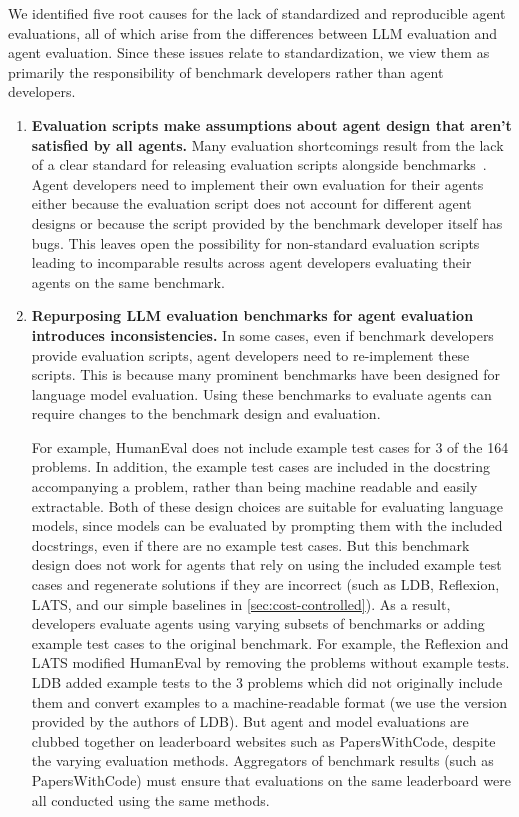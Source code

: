 \documentclass{article}
\begin{document}
We identified five root causes for the lack of standardized and reproducible agent evaluations, all of which arise from the differences between LLM evaluation and agent evaluation. Since these issues relate to standardization, we view them as primarily the responsibility of benchmark developers rather than agent developers.

\begin{enumerate}[leftmargin=*]

    \item \textbf{Evaluation scripts make assumptions about agent design that aren't satisfied by all agents.} Many evaluation shortcomings result from the lack of a clear standard for releasing evaluation scripts alongside benchmarks~\citep{biderman_lessons_2024}. Agent developers need to implement their own evaluation for their agents either because the evaluation script does not account for different agent designs or because the script provided by the benchmark developer itself has bugs. This leaves open the possibility for non-standard evaluation scripts leading to incomparable results across agent developers evaluating their agents on the same benchmark.
    
    \item \textbf{Repurposing LLM evaluation benchmarks for agent evaluation introduces inconsistencies.} In some cases, even if benchmark developers provide evaluation scripts, agent developers need to re-implement these scripts. This is because many prominent benchmarks have been designed for language model evaluation. Using these benchmarks to evaluate agents can require changes to the benchmark design and evaluation. 
    
    For example, HumanEval does not include example test cases for 3 of the 164 problems. In addition, the example test cases are included in the docstring accompanying a problem, rather than being machine readable and easily extractable. Both of these design choices are suitable for evaluating language models, since models can be evaluated by prompting them with the included docstrings, even if there are no example test cases. But this benchmark design does not work for agents that rely on using the included example test cases and regenerate solutions if they are incorrect (such as LDB, Reflexion, LATS, and our simple baselines in \cref{sec:cost-controlled}). 
    As a result, developers evaluate agents using varying subsets of benchmarks or adding example test cases to the original benchmark.
    For example, the Reflexion \citep{shinn_reflexion_2023} and LATS \citep{zhou_language_2023} modified HumanEval by removing the problems without example tests. LDB \citep{zhong_ldb_2024} added example tests to the 3 problems which did not originally include them and convert examples to a machine-readable format (we use the version provided by the authors of LDB). 
    But agent and model evaluations are clubbed together on leaderboard websites such as PapersWithCode, despite the varying evaluation methods. Aggregators of benchmark results (such as PapersWithCode) must ensure that evaluations on the same leaderboard were all conducted using the same methods.


\end{enumerate}
\end{document}
